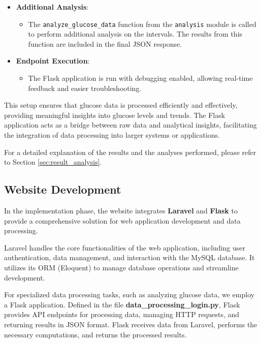 \documentclass{article}
\begin{document}
\begin{itemize}
    \item \textbf{Additional Analysis}:
    \begin{itemize}
        \item The \texttt{analyze\_glucose\_data} function from the \texttt{analysis} module is called to perform additional analysis on the intervals. The results from this function are included in the final JSON response.
    \end{itemize}
    
    \item \textbf{Endpoint Execution}:
    \begin{itemize}
        \item The Flask application is run with debugging enabled, allowing real-time feedback and easier troubleshooting.
    \end{itemize}
\end{itemize}

This setup ensures that glucose data is processed efficiently and effectively, providing meaningful insights into glucose levels and trends. The Flask application acts as a bridge between raw data and analytical insights, facilitating the integration of data processing into larger systems or applications.

For a detailed explanation of the results and the analyses performed, please refer to Section \ref{sec:result_analysis}.


\subsection{Website Development}

In the implementation phase, the website integrates \textbf{Laravel} and \textbf{Flask} to provide a comprehensive solution for web application development and data processing. 

Laravel handles the core functionalities of the web application, including user authentication, data management, and interaction with the MySQL database. It utilizes its ORM (Eloquent) to manage database operations and streamline development.

For specialized data processing tasks, such as analyzing glucose data, we employ a Flask application. Defined in the file \textbf{data\_processing\_login.py}, Flask provides API endpoints for processing data, managing HTTP requests, and returning results in JSON format. Flask receives data from Laravel, performs the necessary computations, and returns the processed results.
\end{document}
